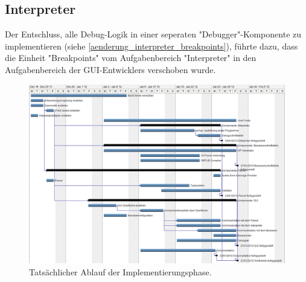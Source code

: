 \subsection{Interpreter}
Der Entschluss, alle Debug-Logik in einer seperaten "Debugger"-Komponente zu implementieren (siehe \ref{aenderung_interpreter_breakpoints}), führte dazu, dass die Einheit "Breakpoints" vom Aufgabenbereich "Interpreter" in den Aufgabenbereich der GUI-Entwicklers verschoben wurde.

\begin{landscape}%
	\begin{figure}%
		\vspace{-2cm}
		\includegraphics[height=1.2\textheight]{images/gantt_implementierung_diag.png}%
		\caption{Tatsächlicher Ablauf der Implementierungsphase.}%
	\end{figure}%
\end{landscape}
